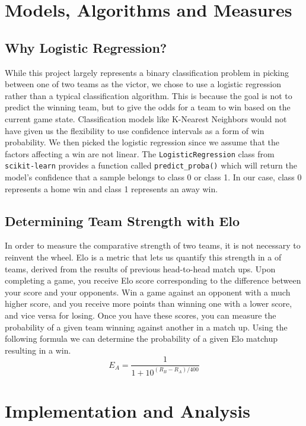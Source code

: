 \documentclass{article}
\begin{document}
\section{Models, Algorithms and Measures}
\subsection{Why Logistic Regression?}
While this project largely represents a binary classification problem in picking between one of two teams as the victor, we chose to use a logistic regression rather than a typical classification algorithm.
This is because the goal is not to predict the winning team, but to give the odds for a team to win based on the current game state.
Classification models like K-Nearest Neighbors would not have given us the flexibility to use confidence intervals as a form of win probability.
We then picked the logistic regression since we assume that the factors affecting a win are not linear.
The \texttt{LogisticRegression} class from \texttt{scikit-learn} provides a function called \texttt{predict\_proba()} which will return the model's confidence that a sample belongs to class 0 or class 1.
In our case, class 0 represents a home win and class 1 represents an away win.

\subsection{Determining Team Strength with Elo}
In order to measure the comparative strength of two teams, it is not necessary to reinvent the wheel. 
Elo is a metric that lets us quantify this strength in a of teams, derived from the results of previous head-to-head match ups.
Upon completing a game, you receive Elo score corresponding to the difference between your score and your opponents. Win a game against
an opponent with a much higher score, and you receive more points than winning one with a lower score, and vice versa for losing.
Once you have these scores, you can measure the probability of a given team winning against another in a match up. 
Using the following formula we can determine the probability of a given Elo matchup resulting in a win.
\[E_{A} = \frac{1}{1 + 10^{(R_{B} - R_{A})/400}}\] 

\section{Implementation and Analysis}
\end{document}
